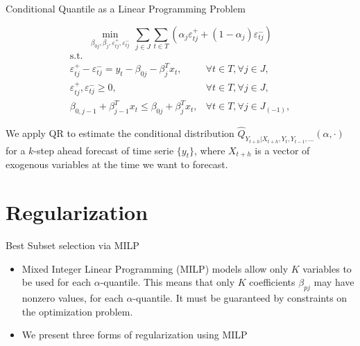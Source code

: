 \begin{frame}{Conditional Quantile as a Linear Programming Problem}

\[
\min_{\beta_{0j},\beta_j,\varepsilon_{tj}^{+}, \varepsilon_{tj}^{-}} \, \sum_{j \in J} \sum_{t \in T}\left(\alpha_j \varepsilon_{t j}^{+}+(1-\alpha_j)\varepsilon_{t j}^{-}\right)
\] \[
\begin{array}{lr}
\text{s.t.} &\\
\varepsilon_{t j}^{+}-\varepsilon_{t j}^{-}=y_{t} - \beta_{0j} - \beta_{j}^T x_{t}, & \forall t \in T, \forall j \in J, \\
\varepsilon_{tj}^+,\varepsilon_{tj}^- \geq 0, & \forall t \in T,\forall j \in J,\\
\beta_{0,j-1} + \beta_{j-1}^T x_{t} \leq \beta_{0j} + \beta_{j}^T x_{t},
& \forall t \in T, \forall j \in J_{(-1)},
\end{array}
\]

We apply QR to estimate the conditional distribution
\(\hat{Q}_{Y_{t+h}|X_{t+h},Y_t, Y_{t-1}, \dots} (\alpha,\cdot)\) for a
\(k\)-step ahead forecast of time serie \(\{y_t\}\), where \(X_{t+h}\)
is a vector of exogenous variables at the time we want to forecast.

\end{frame}

\section{Regularization}\label{regularization}

\begin{frame}{Best Subset selection via MILP}

\begin{itemize}
\item
  Mixed Integer Linear Programming (MILP) models allow only \(K\)
  variables to be used for each \(\alpha\)-quantile. This means that
  only \(K\) coefficients \(\beta_{pj}\) may have nonzero values, for
  each \(\alpha\)-quantile. It must be guaranteed by constraints on the
  optimization problem.
\item
  We present three forms of regularization using MILP
\end{itemize}

\end{frame}

